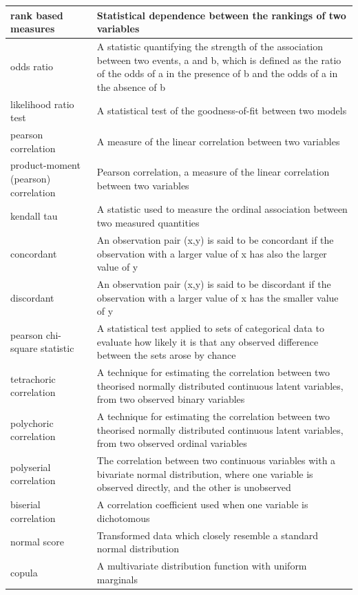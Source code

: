 \documentclass[
]{book}
\begin{document}
\begin{longtable}{>{\raggedright\arraybackslash}p{10em}|>{\raggedright\arraybackslash}p{30em}}
\hline
rank based measures & Statistical dependence between the rankings of two variables\\
\hline
odds ratio & A statistic quantifying the strength of the association between two events, a and b, which is defined as the ratio of the odds of a in the presence of b and the odds of a in the absence of b\\
\hline
likelihood ratio test & A statistical test of the goodness-of-fit between two models\\
\hline
pearson correlation & A measure of the linear correlation between two variables\\
\hline
product-moment (pearson) correlation & Pearson correlation, a measure of the linear correlation between two variables\\
\hline
kendall tau & A statistic used to measure the ordinal association between two measured quantities\\
\hline
concordant & An observation pair (x,y) is said to be concordant if the observation with a larger value of x has also the larger value of y\\
\hline
discordant & An observation pair (x,y) is said to be discordant if the observation with a larger value of x has the smaller value of y\\
\hline
pearson chi-square statistic & A statistical test applied to sets of categorical data to evaluate how likely it is that any observed difference between the sets arose by chance\\
\hline
tetrachoric correlation & A technique for estimating the correlation between two theorised normally distributed continuous latent variables, from two observed binary variables\\
\hline
polychoric correlation & A technique for estimating the correlation between two theorised normally distributed continuous latent variables, from two observed ordinal variables\\
\hline
polyserial correlation & The correlation between two continuous variables with a bivariate normal distribution, where one variable is observed directly, and the other is unobserved\\
\hline
biserial correlation & A correlation coefficient used when one variable is dichotomous\\
\hline
normal score & Transformed data which closely resemble a standard normal distribution\\
\hline
copula & A multivariate distribution function with uniform marginals\\

\end{longtable}
\end{document}
